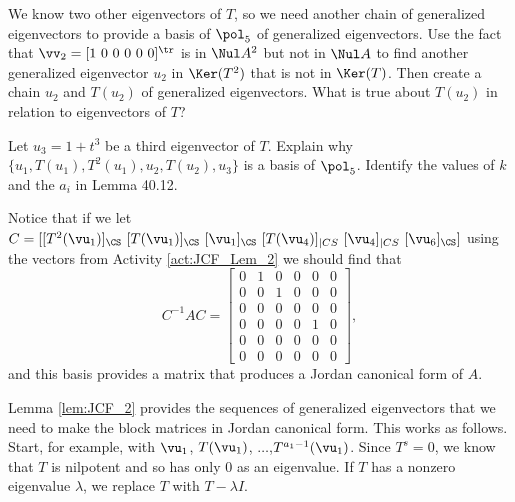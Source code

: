 \begin{activity}
\item We know two other eigenvectors of $T$, so we need another chain of generalized eigenvectors to provide a basis of $\pol_5$ of generalized eigenvectors. Use the fact that $\vv_2 = [1 \ 0 \ 0 \ 0 \ 0 \ 0]^{\tr}$ is in $\Nul A^2$ but not in $\Nul A$ to find another generalized eigenvector $u_2$ in $\Ker(T^2)$ that is not in $\Ker(T)$. Then create a chain $u_2$ and $T(u_2)$ of generalized eigenvectors. What is true about $T(u_2)$ in relation to eigenvectors of $T$?

\item Let $u_3 = 1+t^3$ be a third eigenvector of $T$. Explain why $\{u_1, T(u_1), T^2(u_1), u_2, T(u_2), u_3\}$ is a basis of $\pol_5$. Identify the values of $k$ and the $a_i$ in Lemma 40.12.

\ea

\end{activity} 

Notice that if we let $C = [[T^2(\vu_1)]_{\CS} \ [T(\vu_1)]_{\CS} \ [\vu_1]_{\CS} \  [T(\vu_4)]_{|CS} \ [\vu_4]_{|CS} \ [\vu_6]_{\CS}]$ using the vectors from Activity \ref{act:JCF_Lem_2} we should find that 
\[C^{-1}AC = \left[ \begin{array}{cccccc} 0&1&0&0&0&0 \\ 0&0&1&0&0&0 \\ 0&0&0&0&0&0 \\ 0&0&0&0&1&0 \\ 0&0&0&0&0&0 \\ 0&0&0&0&0&0 \end{array} \right],\]
and this basis provides a matrix that produces a Jordan canonical form of $A$.  

Lemma \ref{lem:JCF_2} provides the sequences of generalized eigenvectors that we need to make the block matrices in Jordan canonical form. This works as follows. Start, for example, with $\vu_1$, $T(\vu_1)$, $\ldots$,$T^{a_1-1}(\vu_1)$. Since $T^s = 0$, we know that $T$ is nilpotent and so has only $0$ as an eigenvalue. If $T$ has a nonzero eigenvalue $\lambda$, we replace $T$ with $T - \lambda I$.  

